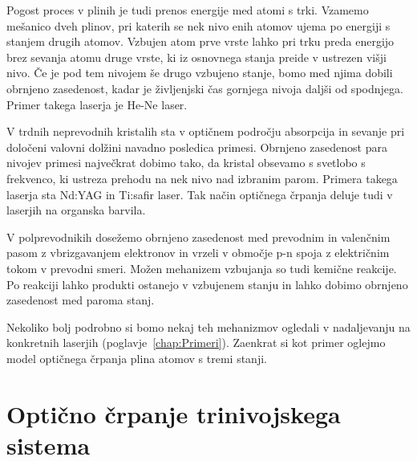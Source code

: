 Pogost proces v plinih je tudi prenos energije med atomi s trki. Vzamemo 
mešanico dveh plinov, pri katerih se nek nivo enih atomov ujema po energiji 
s stanjem drugih atomov. Vzbujen atom prve vrste lahko pri trku preda 
energijo brez sevanja atomu druge vrste, ki iz osnovnega stanja preide v 
ustrezen višji nivo. Če je pod tem nivojem še drugo vzbujeno stanje, bomo 
med njima dobili obrnjeno zasedenost, kadar je življenjski čas gornjega 
nivoja daljši od spodnjega. Primer takega laserja je He-Ne laser.

V trdnih neprevodnih kristalih sta v optičnem področju absorpcija
in sevanje pri določeni valovni dolžini navadno posledica primesi.
Obrnjeno zasedenost para nivojev primesi največkrat dobimo tako, da
kristal obsevamo s svetlobo s frekvenco, ki ustreza prehodu na nek
nivo nad izbranim parom. Primera takega laserja sta Nd:YAG in Ti:safir 
laser. Tak način optičnega črpanja deluje tudi v laserjih na 
organska barvila. 

V polprevodnikih dosežemo obrnjeno zasedenost med prevodnim in valenčnim
pasom z vbrizgavanjem elektronov in vrzeli v območje p-n spoja z električnim
tokom v prevodni smeri. Možen mehanizem vzbujanja so tudi kemične
reakcije. Po reakciji lahko produkti ostanejo v vzbujenem stanju
in lahko dobimo obrnjeno zasedenost med paroma stanj.

Nekoliko bolj podrobno si bomo nekaj teh mehanizmov ogledali v nadaljevanju
na konkretnih laserjih (poglavje~\ref{chap:Primeri}). Zaenkrat si kot primer oglejmo
model optičnega črpanja plina atomov s tremi stanji.

\section{Optično črpanje trinivojskega sistema}

